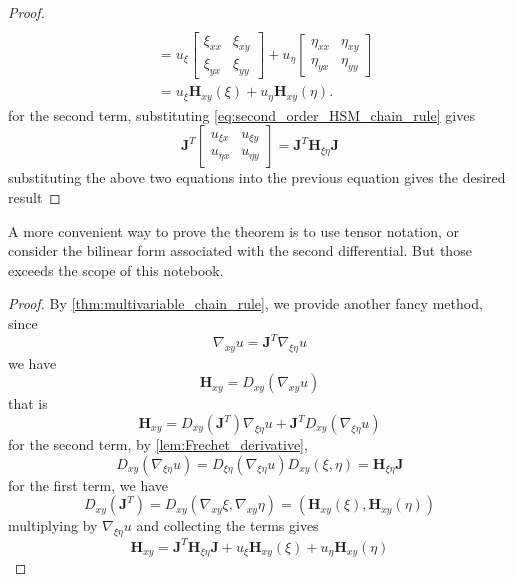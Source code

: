 \documentclass[a4]{overview}
\begin{document}
\begin{proof}
\[\begin{aligned}
\\
&=
u_\xi
\begin{bmatrix}
\xi_{xx} & \xi_{xy}\\
\xi_{yx} & \xi_{yy}
\end{bmatrix}
+
u_\eta
\begin{bmatrix}
\eta_{xx} & \eta_{xy}\\
\eta_{yx} & \eta_{yy}
\end{bmatrix}
\\
&=
u_\xi \boldsymbol{H}_{xy}(\xi)
+
u_\eta \boldsymbol{H}_{xy}(\eta).
\end{aligned}
\]
for the second term, substituting \eqref{eq:second_order_HSM_chain_rule} gives
\[
	\boldsymbol{J}^T
	\begin{bmatrix} u_{\xi x} & u_{\xi y}\\ u_{\eta x} & u_{\eta y} \end{bmatrix}
	=
	\boldsymbol{J}^T \boldsymbol{H}_{\xi\eta} \boldsymbol{J}
\]
substituting the above two equations into the previous equation gives the desired result
\end{proof}

\begin{remark}
	A more convenient way to prove the theorem is to use tensor notation, or 
	consider the bilinear form associated with the second differential.
	But those exceeds the scope of this notebook.
\end{remark}

\begin{proof}
	By \ref{thm:multivariable_chain_rule},  we provide another fancy method, since
	\begin{equation}
		\nabla _{xy}u = \boldsymbol{J}^T \nabla_{\xi\eta}u
	\end{equation}
	we have
	\[
		\boldsymbol{H}_{xy} = D_{xy}(\nabla_{xy} u)
	\] 
	that is
	\[
		\boldsymbol{H}_{xy}
		= D_{xy}(\boldsymbol{J}^T )\nabla_{\xi\eta} u + \boldsymbol{J}^T D_{xy}(\nabla_{\xi\eta} u)
	\] 
	for the second term, by \ref{lem:Frechet_derivative},
	\[
		D_{xy}(\nabla_{\xi\eta} u) = D_{\xi\eta}(\nabla_{\xi\eta} u) D_{xy}(\xi, \eta)
		= \boldsymbol{H}_{\xi\eta} \boldsymbol{J}
	\] 
	for the first term, we have
	\[
		D_{xy}(\boldsymbol{J}^T) = D_{xy} (\nabla_{xy} \xi, \nabla_{xy} \eta)
		= (\boldsymbol{H}_{xy}(\xi), \boldsymbol{H}_{xy}(\eta))
	\]
	multiplying by $\nabla_{\xi\eta} u$ and collecting the terms gives
	\[
		\boldsymbol{H}_{xy} = \boldsymbol{J}^T \boldsymbol{H}_{\xi\eta} \boldsymbol{J}
		+ u_{\xi} \boldsymbol{H}_{xy}(\xi) + u_{\eta} \boldsymbol{H}_{xy}(\eta)
	\] 
\end{proof}
\end{document}
